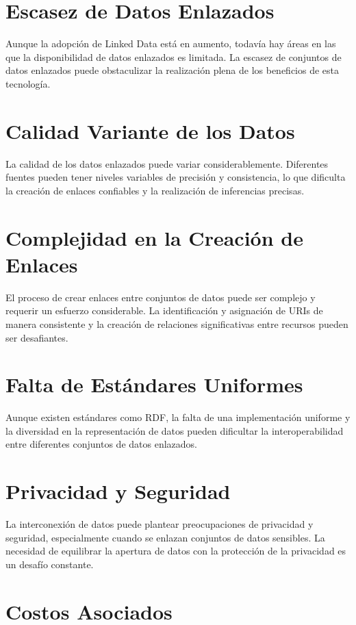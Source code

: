 \documentclass[11pt]{report}
\begin{document}
\section{Escasez de Datos Enlazados}

		Aunque la adopción de Linked Data está en aumento, todavía hay áreas en las que la disponibilidad de datos enlazados es limitada. La escasez de conjuntos de datos enlazados puede obstaculizar la realización plena de los beneficios de esta tecnología.
\section{Calidad Variante de los Datos}

		La calidad de los datos enlazados puede variar considerablemente. Diferentes fuentes pueden tener niveles variables de precisión y consistencia, lo que dificulta la creación de enlaces confiables y la realización de inferencias precisas.
\section{Complejidad en la Creación de Enlaces}

		El proceso de crear enlaces entre conjuntos de datos puede ser complejo y requerir un esfuerzo considerable. La identificación y asignación de URIs de manera consistente y la creación de relaciones significativas entre recursos pueden ser desafiantes.
\section{Falta de Estándares Uniformes}

		Aunque existen estándares como RDF, la falta de una implementación uniforme y la diversidad en la representación de datos pueden dificultar la interoperabilidad entre diferentes conjuntos de datos enlazados.
\section{Privacidad y Seguridad}

		La interconexión de datos puede plantear preocupaciones de privacidad y seguridad, especialmente cuando se enlazan conjuntos de datos sensibles. La necesidad de equilibrar la apertura de datos con la protección de la privacidad es un desafío constante.
\section{Costos Asociados}
\end{document}
